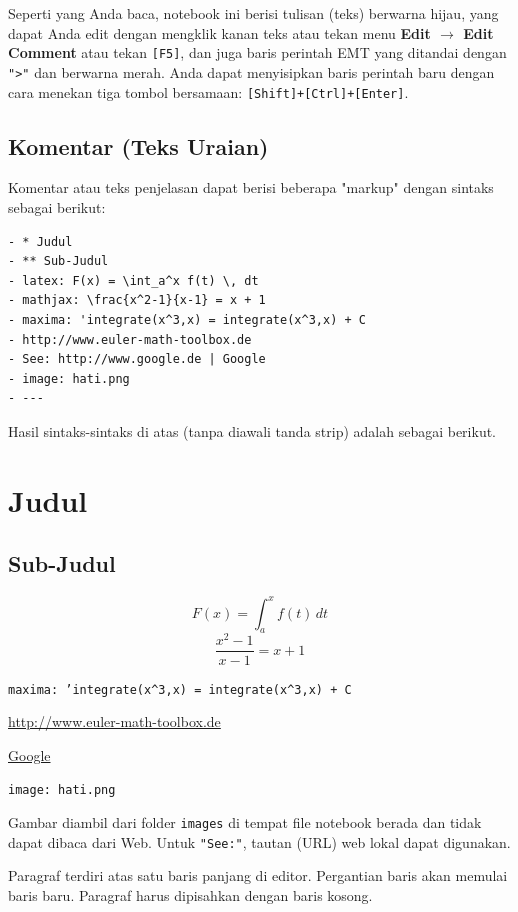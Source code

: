 \documentclass[11pt, a4paper]{article}
\begin{document}
Seperti yang Anda baca, notebook ini berisi tulisan (teks) berwarna \textcolor{emtcomment}{hijau}, yang dapat Anda edit dengan mengklik kanan teks atau tekan menu \textbf{Edit $\rightarrow$ Edit Comment} atau tekan \texttt{[F5]}, dan juga baris perintah EMT yang ditandai dengan \texttt{">"} dan berwarna \textcolor{emtcommand}{merah}. Anda dapat menyisipkan baris perintah baru dengan cara menekan tiga tombol bersamaan: \texttt{[Shift]+[Ctrl]+[Enter]}.

\subsection*{Komentar (Teks Uraian)}

Komentar atau teks penjelasan dapat berisi beberapa "markup" dengan sintaks sebagai berikut:
\begin{verbatim}
- * Judul
- ** Sub-Judul
- latex: F(x) = \int_a^x f(t) \, dt
- mathjax: \frac{x^2-1}{x-1} = x + 1
- maxima: 'integrate(x^3,x) = integrate(x^3,x) + C
- http://www.euler-math-toolbox.de
- See: http://www.google.de | Google
- image: hati.png
- ---
\end{verbatim}

Hasil sintaks-sintaks di atas (tanpa diawali tanda strip) adalah sebagai berikut.

\section*{Judul}
\subsection*{Sub-Judul}

$$F(x) = \int_a^x f(t) \, dt$$
$$\frac{x^2-1}{x-1} = x + 1$$

\noindent\texttt{maxima: 'integrate(x\^{}3,x) = integrate(x\^{}3,x) + C}

\noindent\url{http://www.euler-math-toolbox.de}

\noindent\href{http://www.google.de}{Google}

\noindent\texttt{image: hati.png}

\noindent\hrulefill

\medskip
Gambar diambil dari folder \texttt{images} di tempat file notebook berada dan tidak dapat dibaca dari Web. Untuk \texttt{"See:"}, tautan (URL) web lokal dapat digunakan.

Paragraf terdiri atas satu baris panjang di editor. Pergantian baris akan memulai baris baru. Paragraf harus dipisahkan dengan baris kosong.
\end{document}

